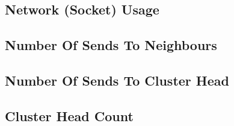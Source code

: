 \documentclass[USenglish]{uit-thesis}
\begin{document}
\subsection{Network (Socket) Usage}




\subsection{Number Of Sends To Neighbours}



\subsection{Number Of Sends To Cluster Head}



\subsection{Cluster Head Count}
\end{document}
